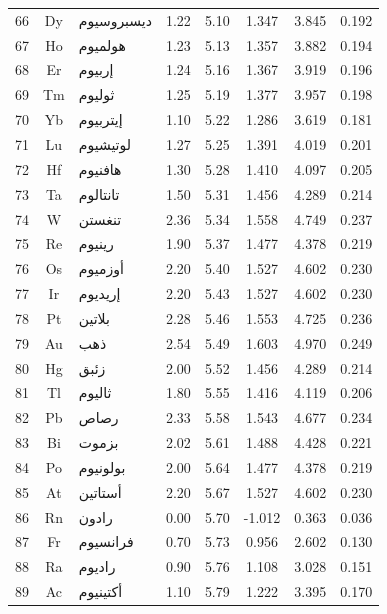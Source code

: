 \documentclass[12pt,a4paper]{article}
\theoremstyle{remark}
\begin{document}
\begin{longtable}{|c|c|p{2.5cm}|c|c|c|c|c|}
		66 & Dy & ديسبروسيوم    & 1.22 & 5.10 & 1.347  & 3.845  & 0.192 \\
		67 & Ho & هولميوم       & 1.23 & 5.13 & 1.357  & 3.882  & 0.194 \\
		68 & Er & إربيوم        & 1.24 & 5.16 & 1.367  & 3.919  & 0.196 \\
		69 & Tm & ثوليوم        & 1.25 & 5.19 & 1.377  & 3.957  & 0.198 \\
		70 & Yb & إيتربيوم      & 1.10 & 5.22 & 1.286  & 3.619  & 0.181 \\
		71 & Lu & لوتيشيوم      & 1.27 & 5.25 & 1.391  & 4.019  & 0.201 \\
		72 & Hf & هافنيوم       & 1.30 & 5.28 & 1.410  & 4.097  & 0.205 \\
		73 & Ta & تانتالوم      & 1.50 & 5.31 & 1.456  & 4.289  & 0.214 \\
		74 & W  & تنغستن        & 2.36 & 5.34 & 1.558  & 4.749  & 0.237 \\
		75 & Re & رينيوم        & 1.90 & 5.37 & 1.477  & 4.378  & 0.219 \\
		76 & Os & أوزميوم       & 2.20 & 5.40 & 1.527  & 4.602  & 0.230 \\
		77 & Ir & إريديوم       & 2.20 & 5.43 & 1.527  & 4.602  & 0.230 \\
		78 & Pt & بلاتين        & 2.28 & 5.46 & 1.553  & 4.725  & 0.236 \\
		79 & Au & ذهب           & 2.54 & 5.49 & 1.603  & 4.970  & 0.249 \\
		80 & Hg & زئبق          & 2.00 & 5.52 & 1.456  & 4.289  & 0.214 \\
		81 & Tl & ثاليوم        & 1.80 & 5.55 & 1.416  & 4.119  & 0.206 \\
		82 & Pb & رصاص          & 2.33 & 5.58 & 1.543  & 4.677  & 0.234 \\
		83 & Bi & بزموت         & 2.02 & 5.61 & 1.488  & 4.428  & 0.221 \\
		84 & Po & بولونيوم      & 2.00 & 5.64 & 1.477  & 4.378  & 0.219 \\
		85 & At & أستاتين       & 2.20 & 5.67 & 1.527  & 4.602  & 0.230 \\
		86 & Rn & رادون         & 0.00 & 5.70 & -1.012 & 0.363  & 0.036 \\
		87 & Fr & فرانسيوم      & 0.70 & 5.73 & 0.956  & 2.602  & 0.130 \\
		88 & Ra & راديوم        & 0.90 & 5.76 & 1.108  & 3.028  & 0.151 \\
		89 & Ac & أكتينيوم      & 1.10 & 5.79 & 1.222  & 3.395  & 0.170 \\

\end{longtable}
\end{document}
